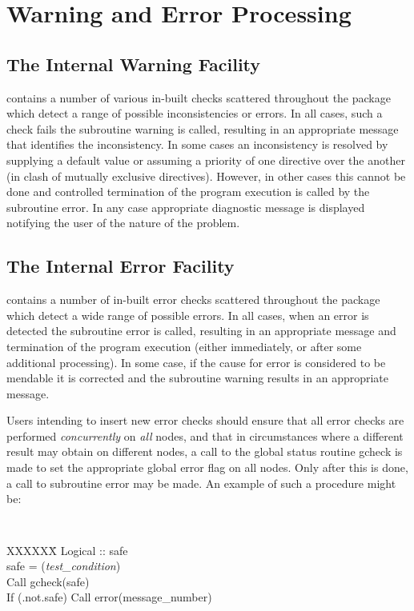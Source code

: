 \section{Warning and Error Processing}

\subsection{The \D Internal Warning Facility}

\D contains a number of various in-built checks scattered
throughout the package which detect a range of possible
inconsistencies or errors.  In all cases, such a check fails the
subroutine {\sc warning} is called, resulting in an appropriate
message that identifies the inconsistency.  In some cases an
inconsistency is resolved by \D supplying a default value or \D
assuming a priority of one directive over the another (in clash of
mutually exclusive directives).  However, in other cases this
cannot be done and controlled termination of the program execution
is called by the subroutine {\sc error}.  In any case appropriate
diagnostic message is displayed notifying the user of the nature
of the problem.

\subsection{The \D Internal Error Facility}

\D contains a number of in-built error checks scattered throughout
the package which detect a wide range of possible errors.  In all
cases, when an error is detected the subroutine {\sc error} is
called, resulting in an appropriate message and termination of the
program execution (either immediately, or after some additional
processing).  In some case, if the cause for error is considered
to be mendable it is corrected and the subroutine {\sc warning}
results in an appropriate message.

Users intending to insert new error checks should ensure that all
error checks are performed {\em concurrently} on {\em all} nodes,
and that in circumstances where a different result may obtain on
different nodes, a call to the global status routine {\sc gcheck}
is made to set the appropriate global error flag on all nodes.
Only after this is done, a call to subroutine {\sc error} may be
made.  An example of such a procedure might be:

{\tt
\begin{tabbing}
XXXXXX\=\kill
\> Logical :: safe \\
\> safe = ({\em test\_condition}) \\
\> Call gcheck(safe) \\
\> If (.not.safe) Call error(message\_number)
\end{tabbing}
}

